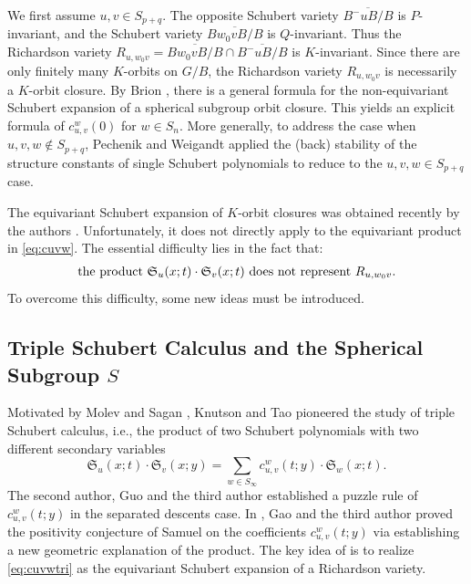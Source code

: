 \documentclass[12pt,reqno]{amsart}
\numberwithin{equation}{section}
\theoremstyle{definition}
\begin{document}
We first assume $u,v\in S_{p+q}$. 
The opposite Schubert variety $\overline{B^-uB/B}$ is $P$-invariant, and 
the Schubert variety $\overline{Bw_0vB/B}$ is $Q$-invariant. 
Thus the Richardson variety $R_{u,w_0v}=\overline{B{w_0v}B/B}\cap \overline{B^-uB/B}$ is $K$-invariant. 
Since there are only finitely many $K$-orbits on $G/B$, the Richardson variety $R_{u,w_0v}$ is necessarily a $K$-orbit closure. 
By Brion \cite{Brion}, there is a general formula for the non-equivariant Schubert expansion of a spherical subgroup orbit closure. This yields an explicit formula of $c_{u,v}^w(0)$ for $w\in S_n$. 
More generally, to address the case when $u,v,w\notin S_{p+q}$, Pechenik and Weigandt \cite{Pandt} applied the (back) stability of the structure constants of single Schubert polynomials to reduce to the $u,v,w\in S_{p+q}$ case.




The equivariant Schubert expansion of $K$-orbit closures was obtained recently by the authors \cite{WE}. Unfortunately, it does not directly apply to the equivariant product in \eqref{eq:cuvw}. 
The essential difficulty  lies in the fact that: 
\begin{equation}\label{eq:diff}
\begin{matrix}
\text{the product $\mathfrak{S}_u(x;t)\cdot \mathfrak{S}_{v}(x;t)$ } 
\text{%
does not represent $R_{u,w_0v}$.}
\end{matrix}
\end{equation}
To overcome this difficulty, some new ideas must be introduced. 

\subsection{Triple Schubert Calculus and the Spherical Subgroup $S$}
Motivated by Molev and Sagan \cite{MS99}, Knutson and Tao \cite{KT03} pioneered the study of triple Schubert calculus, 
i.e., the product of two Schubert polynomials with two different secondary variables
\begin{equation}\label{eq:cuvwtri}
\mathfrak{S}_u(x;t)\cdot \mathfrak{S}_{v}(x;y)
=\sum_{w\in S_\infty} c_{u,v}^w(t;y)
\cdot\mathfrak{S}_{w}(x;t).
\end{equation}
The second author, Guo and the third author \cite{FGX} established a puzzle rule of $c_{u,v}^w(t;y)$ in the separated descents case. 
In \cite{Gaox}, Gao and the third author proved the positivity conjecture of Samuel \cite{Sam24} on the coefficients $c_{u,v}^w(t;y)$ via establishing a new geometric explanation of the product. 
The key idea of \cite{Gaox} is to realize \eqref{eq:cuvwtri} as the equivariant Schubert expansion of a Richardson variety. 
\end{document}
